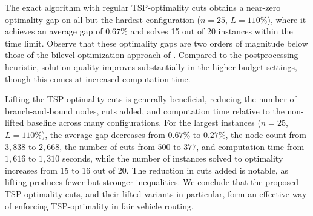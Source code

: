 \documentclass[a4paper,fleqn]{cas-dc}%
\begin{document}
The exact algorithm with regular TSP-optimality cuts obtains a near-zero optimality gap on all but the hardest configuration ($n = 25$, $L = 110\%$), where it achieves an average gap of $0.67\%$ and solves 15 out of 20 instances within the time limit. Observe that these optimality gaps are two orders of magnitude below those of the bilevel optimization approach of \citet{ljubic2026fairvehicle}. Compared to the postprocessing heuristic, solution quality improves substantially in the higher-budget settings, though this comes at increased computation time. 

Lifting the TSP-optimality cuts is generally beneficial, reducing the number of branch-and-bound nodes, cuts added, and computation time relative to the non-lifted baseline across many configurations. For the largest instances ($n = 25$, $L = 110\%$), the average gap decreases from $0.67\%$ to $0.27\%$, the node count from $3{,}838$ to $2{,}668$, the number of cuts from $500$ to $377$, and computation time from $1{,}616$ to $1{,}310$ seconds, while the number of instances solved to optimality increases from 15 to 16 out of 20. The reduction in cuts added is notable, as lifting produces fewer but stronger inequalities. We conclude that the proposed TSP-optimality cuts, and their lifted variants in particular, form an effective way of enforcing TSP-optimality in fair vehicle routing.



\end{document}
